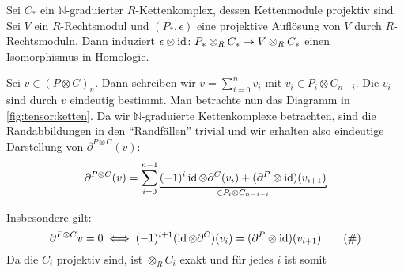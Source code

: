 \begin{lemma}[label=lem:projaufl_iso_hom,{name=[{Tensorieren mit projektiver Auflösung anstatt einem Rechtsmodul}]}]
	Sei $C_*$ ein $\mathbb{N}$-graduierter $R$-Kettenkomplex, dessen Kettenmodule projektiv sind.
	Sei $V$ ein $R$-Rechtsmodul und $(P_*,\epsilon)$ eine projektive Auflösung von $V$ durch $R$-Rechtsmoduln.
	Dann induziert $\epsilon \otimes \operatorname{id} \colon P_* \otimes_R C_* \to V \otimes_R C_*$ einen Isomorphismus in Homologie.
\end{lemma}
\begin{beweis}
	Sei $v \in (P \otimes C)_n$.
	Dann schreiben wir $v=\sum_{i=0}^{n} v_i$ mit $v_i \in P_i \otimes C_{n-i}$.
	Die $v_i$ sind durch $v$ eindeutig bestimmt.
	Man betrachte nun das Diagramm in \cref{fig:tensor:ketten}.
	Da wir $\mathbb{N}$-graduierte Kettenkomplexe betrachten, sind die Randabbildungen in den \enquote{Randfällen} trivial und wir erhalten also eindeutige Darstellung von $\partial^{P \otimes C}(v)$:
	\[
		\partial^{P \otimes C}(v)= \sum_{i=0}^{n-1} \Underbracket{(-1)^i \id \otimes \partial^C(v_i) + (\partial^P \otimes \id)(v_{i+1})}{\in P_i \otimes C_{n-1-i}}
	\]
	\begin{figure}[bt]
	\end{figure}%
	Insbesondere gilt: 
	\begin{equation}
		\partial^{P \otimes C}v =0 \iff (-1)^{i+1} (\operatorname{id} \otimes \partial^C)(v_i)= (\partial^P \otimes \operatorname{id})(v_{i+1}) \label{eq:13:1}\tag{\#}
	\end{equation}
	Da die $C_i$ projektiv sind, ist $\otimes_R C_i$ exakt und für jedes $i$ ist somit
	\begin{equation}
		\begin{tikzcd}[sep=large]

\end{tikzcd}
\end{equation}
\end{beweis}
